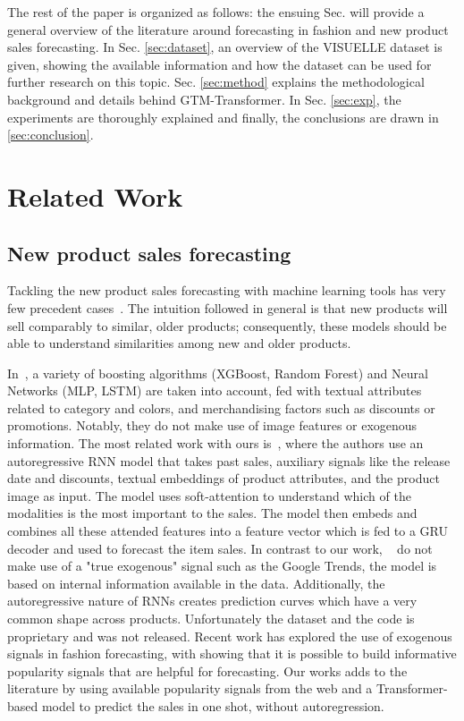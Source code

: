 \documentclass{article}
\newcommand{\datasetname}[0] {VISUELLE}
\newcommand{\approachname}[0] {GTM-Transformer\xspace}
\begin{document}
The rest of the paper is organized as follows: the ensuing Sec. will provide a general overview of the literature around forecasting in fashion and new product sales forecasting. In Sec. \ref{sec:dataset}, an overview of the \datasetname{} dataset is given, showing the available information and how the dataset can be used for further research on this topic. Sec. \ref{sec:method} explains the methodological background and details behind \approachname{}. In Sec. \ref{sec:exp}, the experiments are thoroughly explained and finally, the conclusions are drawn in \ref{sec:conclusion}.  
\section{Related Work}\label{sec:related}

\subsection{New product sales forecasting}
Tackling the new product sales forecasting with machine learning tools has very few precedent cases~\cite{ekambaram_attention_2020,singh_fashion_2019}. The intuition followed in general is that new products will sell comparably to similar, older products;  consequently, these models should be able to understand similarities among new and older products. 

In~\cite{singh_fashion_2019}, a variety of boosting algorithms (XGBoost, Random Forest) and Neural Networks (MLP, LSTM) are taken into account, fed with textual attributes related to category and colors, and merchandising factors such as discounts or promotions. Notably, they do not make use of image features or exogenous information. The most related work with ours is~\cite{ekambaram_attention_2020}, where the authors use an autoregressive RNN model that takes past sales, auxiliary signals like the release date and discounts, textual embeddings of product attributes, and the product image as input. The model uses soft-attention to understand which of the modalities is the most important to the sales. The model then embeds and combines all these attended features into a feature vector which is fed to a GRU \cite{cho2014learning} decoder and used to forecast the item sales. In contrast to our work, ~\cite{ekambaram_attention_2020} do not make use of a "true exogenous" signal such as the Google Trends, the model is based on internal information available in the data. Additionally, the autoregressive nature of RNNs creates prediction curves which have a very common shape across products. Unfortunately the dataset and the code is proprietary and was not released. Recent work has explored the use of exogenous signals in fashion forecasting, with \cite{joppi2022pop} showing that it is possible to build informative popularity signals that are helpful for forecasting.
Our works adds to the literature by using available popularity signals from the web and a Transformer-based model to predict the sales in one shot, without autoregression.
\end{document}
